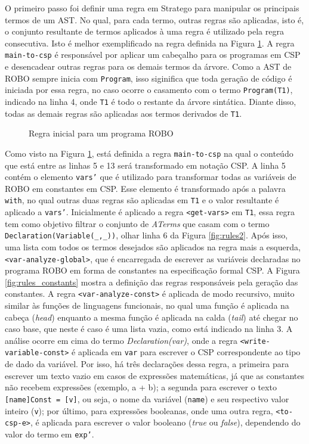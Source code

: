 O primeiro passo foi definir uma regra em Stratego para manipular os principais termos de um AST. No qual, para cada termo, outras regras são aplicadas, isto é, o conjunto resultante de termos aplicados à uma regra é utilizado pela regra consecutiva. Isto é melhor exemplificado na regra definida na Figura \ref{fig:rules}. A regra \texttt{main-to-csp} é responsável por aplicar um cabeçalho para os programas em CSP e desencadear outras regras para os demais termos da árvore. Como a AST de ROBO sempre inicia com \texttt{Program}, isso siginifica que toda geração de código é iniciada por essa regra, no caso ocorre o casamento com o termo \texttt{Program(T1)}, indicado na linha 4, onde \texttt{T1} é todo o restante da árvore sintática. Diante disso, todas as demais regras são aplicadas aos termos derivados de \texttt{T1}.

\begin{figure}[h]
\centering
\caption{Regra inicial para um programa ROBO}

\label{fig:rules}
\end{figure}

Como visto na Figura \ref{fig:rules}, está definida a regra \texttt{main-to-csp} na qual o conteúdo que está entre as linhas 5 e 13 será transformado em notação CSP. A linha 5 contém o elemento \texttt{vars'} que é utilizado para transformar todas as variáveis de ROBO em constantes em CSP. Esse elemento é transformado após a palavra \texttt{with}, no qual outras duas regras são aplicadas em \texttt{T1} e o valor resultante é aplicado a \texttt{vars'}. Inicialmente é aplicado a regra \texttt{<get-vars>} em \texttt{T1}, essa regra tem como objetivo filtrar o conjunto de \textit{ATerms} que casam com o termo \texttt{Declaration(Variable(\_,\_))}, olhar linha 6 da Figura \ref{fig:rules2}. Após isso, uma lista com todos os termos desejados são aplicados na regra mais a esquerda, \texttt{<var-analyze-global>}, que é encarregada de escrever as variáveis declaradas no programa ROBO em forma de constantes na especificação formal CSP. A Figura \ref{fig:rules_constants} mostra a definição das regras responsáveis pela geração das constantes. A regra \texttt{<var-analyze-const>} é aplicada de modo recursivo, muito similar às funções de linguagens funcionais, no qual uma função é aplicada na cabeça (\textit{head}) enquanto a mesma função é aplicada na calda (\textit{tail}) até chegar no caso base, que neste é caso é uma lista vazia, como está indicado na linha 3. A análise ocorre em cima do termo \textit{Declaration(var)}, onde a regra \texttt{<write-variable-const>} é aplicada em \texttt{var} para escrever o CSP correspondente ao tipo de dado da variável. Por isso, há três declarações dessa regra, a primeira para escrever um texto vazio em casos de expressões matemáticas, já que as constantes não recebem expressões (exemplo, a + b); a segunda para escrever o texto \texttt{[name]Const = [v]}, ou seja, o nome da variável (\texttt{name}) e seu respectivo valor inteiro (\texttt{v}); por último, para expressões booleanas, onde uma outra regra, \texttt{<to-csp-e>}, é aplicada para escrever o valor booleano (\textit{true} ou \textit{false}), dependendo do valor do termo em \texttt{exp'}.


